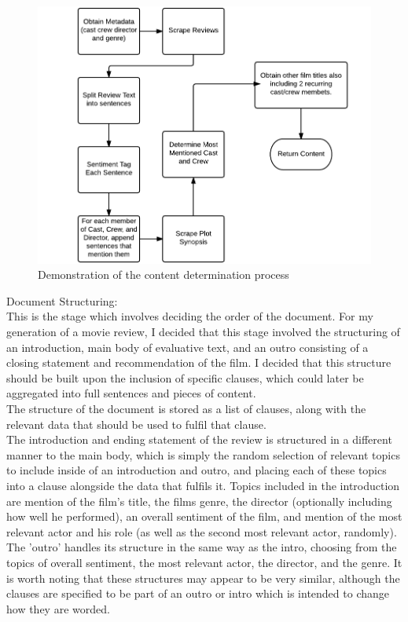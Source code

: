 \begin{figure}
\centering
\includegraphics[width=0.7\linewidth]{figures/diagrams_etc/content_det}
\caption{Demonstration of the content determination process}
\label{fig:contentdet}
\end{figure}


Document Structuring:\\
This is the stage which involves deciding the order of the document. For my generation of a movie review, I decided that this stage involved the structuring of an introduction, main body of evaluative text, and an outro consisting of a closing statement and recommendation of the film.
I decided that this structure should be built upon the inclusion of specific clauses, which could later be aggregated into full sentences and pieces of content.\\

The structure of the document is stored as a list of clauses, along with the relevant data that should be used to fulfil that clause.\\
The introduction and ending statement of the review is structured in a different manner to the main body, which is simply the random selection of relevant topics to include inside of an introduction and outro, and placing each of these topics into a clause alongside the data that fulfils it.
Topics included in the introduction are mention of the film's title, the films genre, the director (optionally including how well he performed), an overall sentiment of the film, and mention of the most relevant actor and his role (as well as the second most relevant actor, randomly).
The 'outro' handles its structure in the same way as the intro, choosing from the topics of overall sentiment, the most relevant actor, the director, and the genre. It is worth noting that these structures may appear to be very similar, although the clauses are specified to be part of an outro or intro which is intended to change how they are worded.\\

